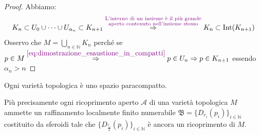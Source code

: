 \begin{proof}
        Abbiamo:
        \[ K_n \subset U_0 \cup \dots \cup U_{\alpha_n} \subset K_{n+1}
        \overset{\textcolor{violet}{\substack{\text{L'interno di un insieme è il più grande} \\ \text{aperto contenuto nell'insieme stesso} }}}{\Rightarrow} K_n \subset \operatorname{Int} (K_{n+1}) \]
        Osservo che $\displaystyle M = \bigcup_{n \in \mathbb{N}} K_n$ perché se $p \in M \overset{\textcolor{violet}{\eqref{eq:dimostrazione_esaustione_in_compatti}}}{\Rightarrow} p \in U_n \Rightarrow p \in K_{n+1}$ essendo $\alpha_n >n$
        \end{proof}
        \newpage
        \begin{teorema}
        \label{th:varieta_topologica_paracompatta}
        \mbox{}

        Ogni varietà topologica è uno spazio paracompatto. 
        
        Più precisamente ogni ricoprimento aperto $\mathcal{A}$ di una varietà topologica $M$ ammette un raffinamento localmente finito numerabile
        $\mathfrak{B} = \{D_{r_i}(p_i)\}_{i \in \mathbb{N}}$ costituito da sferoidi tale che $\{D_{\tfrac{r_i}{2}}(p_i)\}_{i \in \mathbb{N}}$ è ancora un 
        ricoprimento di $M$.
        \end{teorema}

